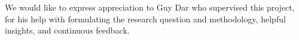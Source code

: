 We would like to express appreciation to Guy Dar who supervised this project, for his help with formulating the research question and methodology, helpful insights, and continuous feedback.
